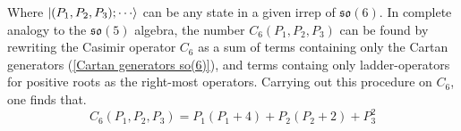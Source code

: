 %
%
Where $\ket{(P_1,P_2,P_3); \cdots }$ can be any state in a given irrep of $\mathfrak{so}(6)$. In complete analogy to the $\mathfrak{so}(5)$ algebra, the number $C_6(P_1,P_2,P_3)$ can be found by rewriting the Casimir operator $C_6$ as a sum of terms containing only the Cartan generators (\ref{Cartan generators so(6)}), and terms containg only ladder-operators for positive roots as the right-most operators. Carrying out this procedure on $C_6$, one finds that.
%
%
\begin{equation}
C_6(P_1, P_2, P_3) = P_1 (P_1 + 4) + P_2 (P_2 + 2) + P_3^2
\end{equation}
%
%
